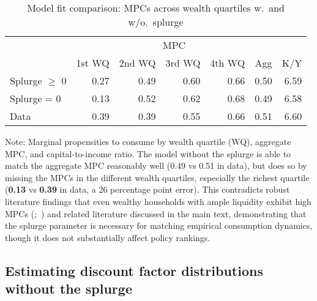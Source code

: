 \documentclass[qe]{econsocart}
\begin{document}
\begin{table}[tb] 
  \caption{Model fit comparison: MPCs across wealth quartiles w.\ and w/o.\ splurge}
  \label{tab:Comparison-Splurge-Table} 
  \centering

  \begin{tabular*}
    {\textwidth}{@{\extracolsep{\fill}}lrrrrrr@{}} 
    \hline
    & \multicolumn{5}{c}{MPC} & \\
    & \multicolumn{1}{c}{1st WQ} & \multicolumn{1}{c}{2nd WQ} & \multicolumn{1}{c}{3rd WQ} & \multicolumn{1}{c}{4th WQ} & \multicolumn{1}{c}{Agg} & \multicolumn{1}{c}{K/Y} \\ \hline
    Splurge $\geq$ 0      & 0.27 & 0.49 & 0.60 & 0.66 & 0.50 & 6.59 \\
    Splurge = 0           & 0.13 & 0.52 & 0.62 & 0.68 & 0.49 & 6.58 \\
    Data                  & 0.39 & 0.39 & 0.55 & 0.66 & 0.51 & 6.60 \\
    \hline
  \end{tabular*}

  \noindent\parbox{\textwidth}{
    \medskip
    \footnotesize Note: Marginal propensities to consume by wealth quartile (WQ), aggregate MPC, and capital-to-income ratio. The model without the splurge is able to match the aggregate MPC reasonably well (0.49 vs 0.51 in data), but does so by missing the MPCs in the different wealth quartiles, especially the richest quartile (\textbf{0.13} vs \textbf{0.39} in data, a 26 percentage point error). This contradicts robust literature findings that even wealthy households with ample liquidity exhibit high MPCs (\cite{crawley2023MicroMacro};~\cite{graham2024mental}) and related literature discussed in the main text, demonstrating that the splurge parameter is necessary for matching empirical consumption dynamics, though it does not substantially affect policy rankings.
  }
\end{table}

\vspace{0.5em}

\subsection{Estimating discount factor distributions without the splurge}
\label{app:nosplurge-estimating-betas} 
\end{document}
